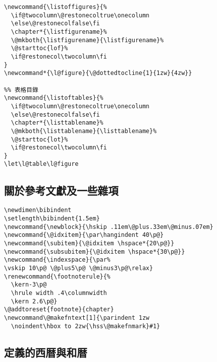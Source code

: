\begin{lstlisting}[firstnumber=1421]
%% 圖片目錄
\newcommand{\listoffigures}{%
  \if@twocolumn\@restonecoltrue\onecolumn
  \else\@restonecolfalse\fi
  \chapter*{\listfigurename}%
  \@mkboth{\listfigurename}{\listfigurename}%
  \@starttoc{lof}%
  \if@restonecol\twocolumn\fi
}
\newcommand*{\l@figure}{\@dottedtocline{1}{1zw}{4zw}}

%% 表格目錄
\newcommand{\listoftables}{%
  \if@twocolumn\@restonecoltrue\onecolumn
  \else\@restonecolfalse\fi
  \chapter*{\listtablename}%
  \@mkboth{\listtablename}{\listtablename}%
  \@starttoc{lot}%
  \if@restonecol\twocolumn\fi
}
\let\l@table\l@figure
\end{lstlisting}

\subsection{關於參考文獻及一些雜項}

\begin{lstlisting}[firstnumber=1443]
\newdimen\bibindent
\setlength\bibindent{1.5em}
\newcommand{\newblock}{\hskip .11em\@plus.33em\@minus.07em}
\newcommand{\@idxitem}{\par\hangindent 40\p@}
\newcommand{\subitem}{\@idxitem \hspace*{20\p@}}
\newcommand{\subsubitem}{\@idxitem \hspace*{30\p@}}
\newcommand{\indexspace}{\par%
\vskip 10\p@ \@plus5\p@ \@minus3\p@\relax}
\renewcommand{\footnoterule}{%
  \kern-3\p@
  \hrule width .4\columnwidth
  \kern 2.6\p@}
\@addtoreset{footnote}{chapter}
\newcommand\@makefntext[1]{\parindent 1zw
  \noindent\hbox to 2zw{\hss\@makefnmark}#1}
\end{lstlisting}

\subsection{定義的西暦與和暦}

